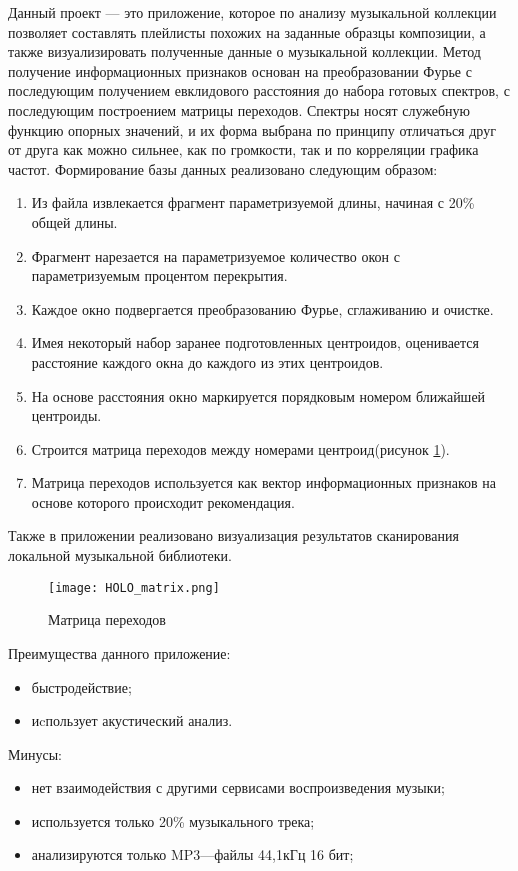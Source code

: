 Данный проект — это приложение, которое по анализу музыкальной коллекции позволяет составлять плейлисты похожих на заданные образцы композиции, а также визуализировать полученные данные о музыкальной коллекции\cite{holo_blog}. Метод получение информационных признаков основан на преобразовании Фурье с последующим получением евклидового расстояния до набора готовых спектров, с последующим построением матрицы переходов. Спектры носят служебную функцию опорных значений, и их форма выбрана по принципу отличаться друг от друга как можно сильнее, как по громкости, так и по корреляции графика частот.
Формирование базы данных реализовано следующим образом:
\begin{enumerate}[label=\arabic*.]
\item Из файла извлекается фрагмент параметризуемой длины, начиная с 20\% общей длины.
\item Фрагмент нарезается на параметризуемое количество окон с параметризуемым процентом перекрытия.
\item Каждое окно подвергается преобразованию Фурье, сглаживанию и очистке.
\item Имея некоторый набор заранее подготовленных центроидов, оценивается расстояние каждого окна до каждого из этих центроидов.
\item На основе расстояния окно маркируется порядковым номером ближайшей центроиды.
\item Строится матрица переходов между номерами центроид(рисунок \ref{fig:domain:holo:matrix}).
\item Матрица переходов используется как вектор информационных признаков на основе которого происходит рекомендация.
\end{enumerate}
Также в приложении реализовано визуализация результатов сканирования локальной музыкальной библиотеки.

\begin{figure}
\centering
  \texttt{[image: HOLO\_matrix.png]}  
  \caption{Матрица переходов}
  \label{fig:domain:holo:matrix}
\end{figure}

Преимущества данного приложение:
\begin{itemize}
\item быстродействие;
\item иcпользует акустический анализ.
\end{itemize}
Минусы:
\begin{itemize}
\item нет взаимодействия с другими сервисами воспроизведения музыки;
\item используется только 20\% музыкального трека;
\item анализируются только MP3—файлы 44,1кГц 16 бит;
\end{itemize}

